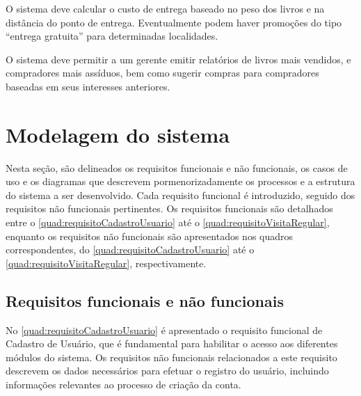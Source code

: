 O sistema deve calcular o custo de entrega baseado no peso dos livros e na distância do ponto de entrega. Eventualmente podem haver promoções do tipo “entrega gratuita” para determinadas localidades.

O sistema deve permitir a um gerente emitir relatórios de livros mais vendidos, e compradores mais assíduos, bem como sugerir compras para compradores baseadas em seus interesses anteriores.

\section{Modelagem do sistema}\label{sec:modelagemSistema}

Nesta seção, são delineados os requisitos funcionais e não funcionais, os casos de uso e os diagramas que descrevem pormenorizadamente os processos e a estrutura do sistema a ser desenvolvido. Cada requisito funcional é introduzido, seguido dos requisitos não funcionais pertinentes.
Os requisitos funcionais são detalhados entre o \autoref{quad:requisitoCadastroUsuario} até o \autoref{quad:requisitoVisitaRegular}, enquanto os requisitos não funcionais são apresentados nos quadros correspondentes, do \autoref{quad:requisitoCadastroUsuario} até o \autoref{quad:requisitoVisitaRegular}, respectivamente.

\subsection{Requisitos funcionais e não funcionais}\label{subsec:requisitosFuncionaisNaoFuncionais}

No \autoref{quad:requisitoCadastroUsuario} é apresentado o requisito funcional de Cadastro de Usuário, que é fundamental para habilitar o acesso aos diferentes módulos do sistema. Os requisitos não funcionais relacionados a este requisito descrevem os dados necessários para efetuar o registro do usuário, incluindo informações relevantes ao processo de criação da conta.

